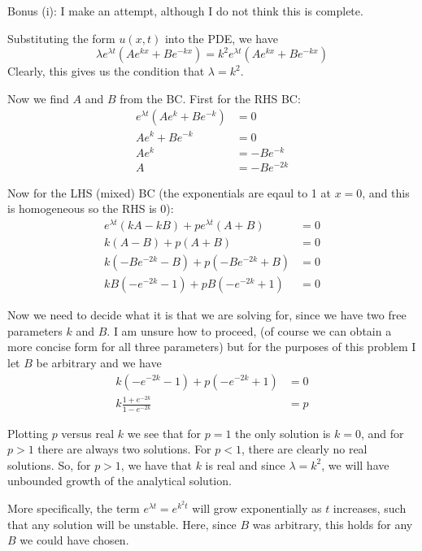 \documentclass[11pt]{article}
\def\f{\frac }
\begin{document}
\begin{enumerate}
Bonus (i): I make an attempt, although I do not think this is complete.

Substituting the form $u(x,t)$ into the PDE, we have
\[ \lambda e ^{\lambda t} \left ( A e ^{kx} + B e ^{-kx} \right ) = k^2 e ^{\lambda t} \left ( A e ^{kx} + B e ^{-kx} \right ) \]
Clearly, this gives us the condition that $\lambda = k^2$.

Now we find $A$ and $B$ from the BC.
First for the RHS BC:
\begin{align*} e ^{\lambda t} \left ( A e ^{k} + B e ^{-k} \right ) & = 0\\
A e ^{k} + B e ^{-k} & = 0\\
A e ^{k} &= - B e ^{-k} \\
A &= - B e ^{-2k} \end{align*}

Now for the LHS (mixed) BC (the exponentials are eqaul to 1 at $x=0$, and this is homogeneous so the RHS is 0):
\begin{align*} e ^{\lambda t} \left ( kA  - kB \right ) + p e ^{\lambda t} \left ( A +B \right )& = 0\\
k\left ( A  - B \right ) + p \left ( A +B \right )& = 0\\
k\left ( - B e ^{-2k}  - B\right ) + p \left ( - B e ^{-2k} +B \right )& = 0\\
kB\left ( - e ^{-2k}  - 1\right ) + p B \left ( - e ^{-2k} + 1 \right )& = 0\end{align*}

Now we need to decide what it is that we are solving for, since we have two free parameters $k$ and $B$.
I am unsure how to proceed, (of course we can obtain a more concise form for all three parameters) but for the purposes of this problem I let $B$ be arbitrary and we have
\begin{align*} k\left ( - e ^{-2k}  - 1\right ) + p \left ( - e ^{-2k} + 1 \right )& = 0\\
k\f{ 1 + e ^{-2k}  } { 1 - e ^{-2k} } &= p \end{align*}

Plotting $p$ versus real $k$ we see that for $p=1$ the only solution is $k=0$, and for $p>1$ there are always two solutions.
For $p<1$, there are clearly no real solutions.
So, for $p>1$, we have that $k$ is real and since $\lambda = k^2$, we will have unbounded growth of the analytical solution.

More specifically, the term $e^{\lambda t} = e^{k^2 t}$ will grow exponentially as $t$ increases, such that any solution will be unstable.
Here, since $B$ was arbitrary, this holds for any $B$ we could have chosen.


\end{enumerate}
\end{document}
